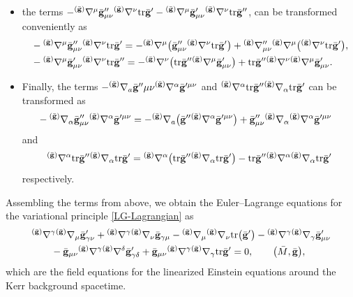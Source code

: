 \documentclass[11pt]{article}
\numberwithin{equation}{section}
\def\grad{{\nabla}}%
\newcommand{\leftexp}[2]{{\vphantom{#2}}^{#1}{#2}}
\def \gm{\gamma}
\def \a{\alpha}
\renewcommand{\gg}{{\bf g}}
\newcommand{\bgg}{{\bar{\bf g}}}
\renewcommand{\a}{\alpha}
\renewcommand{\d}{\delta}
\numberwithin{equation}{section}
\begin{document}
\begin{itemize}
\item the terms $ - \leftexp{(\bar{\gg})}{\grad}^\mu \bgg''_{\mu \nu} \leftexp{(\bar{\gg})}{\grad}^\nu {\rm tr} \bgg' - \leftexp{(\bar{\gg})}{\grad}^\mu \bgg'_{\mu \nu} \leftexp{(\bar{\gg})}{\grad}^\nu {\rm tr} \bgg''$, can be transformed conveniently as
\begin{align*}
&- \leftexp{(\bar{\gg})}{\grad}^\mu \bgg''_{\mu \nu} \leftexp{(\bar{\gg})}{\grad}^\nu {\rm tr}\bgg'=
- \leftexp{(\bar{\gg})}{\grad}^\mu \bigl(\bgg''_{\mu \nu} \leftexp{(\bar{\gg})}{\grad}^\nu {\rm tr} \bgg'\bigr)
+ \leftexp{(\bar{\gg})}{\grad}''_{\mu \nu} \leftexp{(\bar{\gg})}{\grad}^\mu \bigl( \leftexp{(\bar{\gg})}{\grad}^\nu {\rm tr} \bgg'\bigr), \\
&- \leftexp{(\bar{\gg})}{\grad}^\mu \bgg'_{\mu \nu} \leftexp{(\bar{\gg})}{\grad}^\nu {\rm tr} \bgg''=
- \leftexp{(\bar{\gg})}{\grad}^\nu \bigl({\rm tr}\bgg'' \leftexp{(\bar{\gg})}{\grad}^\mu \bgg'_{\mu \nu}\bigr) +
{\rm tr}\bgg'' \leftexp{(\bar{\gg})}{\grad}^\nu \leftexp{(\bar{\gg})}{\grad}^\mu \bgg'_{ \mu \nu}.
\end{align*}

\item Finally, the terms $ - \leftexp{(\bar{\gg})}{\grad}_a \bgg''{\mu \nu} \leftexp{(\bar{\gg})}{\grad}^\a \bgg'^{ \mu \nu}$ and $ \leftexp{(\bar{\gg})}{\grad}^\a {\rm tr} \bgg'' \leftexp{(\bar{\gg})}{\grad}_\a {\rm tr} \bgg'$ can be transformed as
\begin{align*}
&-\leftexp{(\bar{\gg})}{\grad}_\a \bgg''_{\mu \nu} \leftexp{(\bar{\gg})}{\grad}^\a \bgg'^{\mu \nu}=
-\leftexp{(\bar{\gg})}{\grad}_a \bigl(\bgg'' \leftexp{(\bar{\gg})}{\grad}^\a \bgg'^{\mu \nu}\bigr) + \bgg''_{\mu \nu} \leftexp{(\bar{\gg})}{\grad}_\a \leftexp{(\bar{\gg})}{\grad}^\a \bgg'^{\mu \nu}
\end{align*}
and
\[
\leftexp{(\bar{\gg})}{\grad}^\a {\rm tr}\bgg'' \leftexp{(\bar{\gg})}{\grad}_\a {\rm tr} \bgg' = \leftexp{(\bar{\gg})}{\grad}^\a \bigl({\rm tr}\bgg'' \leftexp{(\bar{\gg})}{\grad}_\a {\rm tr}\bgg'\bigr) -
{\rm tr} \bgg'' \leftexp{(\bar{\gg})}{\grad}^\a \leftexp{(\bar{\gg})}{\grad}_\a {\rm tr} \bgg'
\]
respectively.
\end{itemize}
Assembling the terms from above, we obtain the Euler--Lagrange equations for the variational principle \eqref{LG-Lagrangian} as
\begin{align*}
&\leftexp{(\bar{\gg})}{\grad}^\gm \leftexp{(\bar{\gg})}{\grad}_\mu \bgg'_{\gm \nu} + \leftexp{(\bar{\gg})}{\grad}^\gm \leftexp{(\bar{\gg})}{\grad}_\nu \bgg_{\gm \mu} - \leftexp{(\bar{\gg})}{\grad}_\mu \leftexp{(\bar{\gg})}{\grad}_\nu {\rm tr}\bigl(\bgg'\bigr) - \leftexp{(\bar{\gg})}{\grad}^\gm \leftexp{(\bar{\gg})}{\grad}_\gm \bgg'_{ \mu \nu} \notag\\
&\qquad{}- \bgg_{\mu \nu}
\leftexp{(\bar{\gg})}{\grad}^\gm \leftexp{(\bar{\gg})}{\grad}^\d \bgg'_{ \gm \d} + \bgg_{\mu \nu}
\leftexp{(\bar{\gg})}{\grad}^\gm \leftexp{(\bar{\gg})}{\grad}_\gm {\rm tr} \bgg' =0, \qquad \bigl(\bar{M}, \bgg\bigr),
\end{align*}
which are the field equations for the linearized Einstein equations around the Kerr background spacetime.
\end{document}
